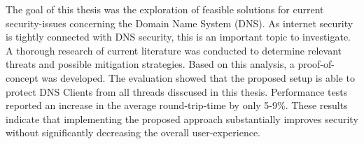 

The goal of this thesis was the exploration of feasible solutions for current security-issues concerning the Domain Name System (DNS). As internet security is tightly connected with DNS security, this is an important topic to investigate. A thorough research of current literature was conducted to determine relevant threats and possible mitigation strategies. Based on this analysis, a proof-of-concept was developed. The evaluation showed that the proposed setup is able to protect DNS Clients from all threads disscused in this thesis. Performance tests reported an increase in the average round-trip-time by only 5-9\%. These results indicate that implementing the proposed approach substantially improves security without significantly decreasing the overall user-experience.